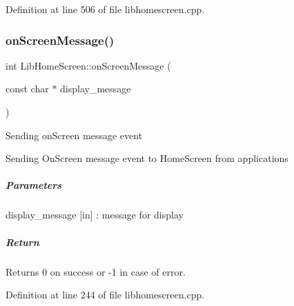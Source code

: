 Definition at line 506 of file libhomescreen.\+cpp.


\mbox{\label{class_lib_home_screen_ac336482036a72b51a822725f1929523c}} 
\subsubsection{\texorpdfstring{on\+Screen\+Message()}{onScreenMessage()}}
{\footnotesize\ttfamily int Lib\+Home\+Screen\+::on\+Screen\+Message (\begin{DoxyParamCaption}\item[{const char $\ast$}]{display\+\_\+message }\end{DoxyParamCaption})}

Sending on\+Screen message event

Sending On\+Screen message event to Home\+Screen from applications

\subparagraph*{Parameters}


\begin{DoxyItemize}
\item display\+\_\+message \mbox{[}in\mbox{]} \+: message for display
\end{DoxyItemize}

\subparagraph*{Return}


\begin{DoxyItemize}
\item Returns 0 on success or -\/1 in case of error. 
\end{DoxyItemize}

Definition at line 244 of file libhomescreen.\+cpp.


